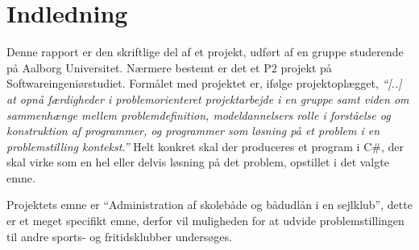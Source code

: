 \chapter{Indledning}\label{chap:indledning}



Denne rapport er den skriftlige del af et projekt, udført af en gruppe studerende på Aalborg Universitet.
Nærmere bestemt er det et P2 projekt på Softwareingeniørstudiet. Formålet med projektet er, ifølge
projektoplægget, \textit{``[..] at opnå færdigheder i problemorienteret projektarbejde i en gruppe samt viden
om sammenhænge mellem problemdefinition, modeldannelsers rolle i forståelse og konstruktion af programmer, og
programmer som løsning på et problem i en problemstilling kontekst.''} Helt konkret skal der produceres et program i
C\#, der skal virke som en hel eller delvis løsning
på det problem, opstillet i det valgte emne.

Projektets emne er ``Administration af skolebåde og bådudlån i en sejlklub'', dette er et meget specifikt
emne, derfor vil  muligheden for at udvide problemstillingen til andre sports- og fritidsklubber undersøges.

